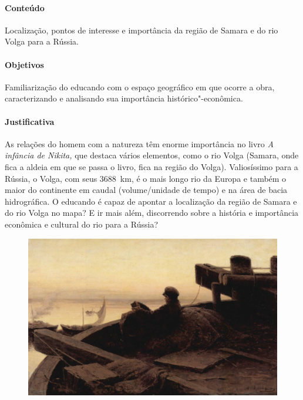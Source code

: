 \documentclass{article}
\begin{document}
\paragraph{Conteúdo}
Localização, pontos de interesse e importância da região de Samara e do
rio Volga para a Rússia.

\paragraph{Objetivos}
Familiarização do educando com o espaço geográfico em que ocorre a obra,
caracterizando e analisando sua importância histórico"-econômica.

\paragraph{Justificativa}
As relações do homem com a natureza têm enorme importância no livro
\emph{A infância de Nikita,} que destaca vários elementos, como o rio
Volga (Samara, onde fica a aldeia em que se passa o livro, fica na
região do Volga). Valiosíssimo para a Rússia, o Volga, com seus 3688~km,
é o mais longo rio da Europa e também o maior do
continente em caudal (volume/unidade de tempo) e na área de bacia
hidrográfica. O educando é capaz de apontar a localização da região de
Samara e do rio Volga no mapa? E ir mais além, discorrendo sobre a
história e importância econômica e cultural do rio para a Rússia?

\begin{figure}[ht!]
\includegraphics[width=\textwidth]{./images/PNLD0049-07.png}
\end{figure}
\end{document}
